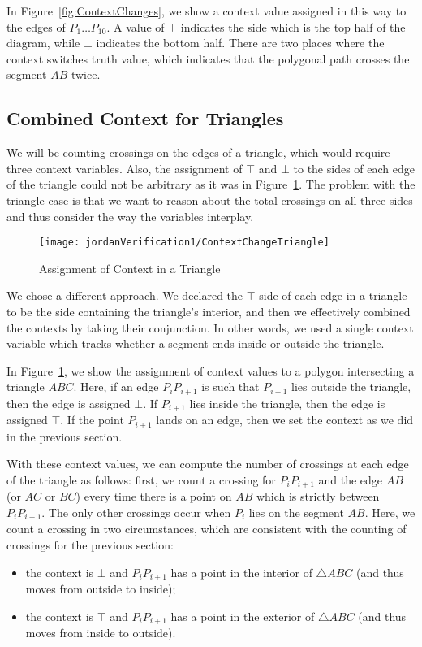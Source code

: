 In Figure~\ref{fig:ContextChanges}, we show a context value assigned in this way to the edges of $P_1\ldots P_{10}$. A value of $\top$ indicates the side which is the top half of the diagram, while $\bot$ indicates the bottom half. There are two places where the context switches truth value, which indicates that the polygonal path crosses the segment $AB$ twice.

\subsection{Combined Context for Triangles}
We will be counting crossings on the edges of a triangle, which would require three context variables. Also, the assignment of $\top$ and $\bot$ to the sides of each edge of the triangle could not be arbitrary as it was in Figure~\ref{fig:ContextChangesTriangle}. The problem with the triangle case is that we want to reason about the total crossings on all three sides and thus consider the way the variables interplay.

\begin{figure}
\centering\texttt{[image: jordanVerification1/ContextChangeTriangle]}
\caption{Assignment of Context in a Triangle}
\label{fig:ContextChangesTriangle}
\end{figure}

We chose a different approach. We declared the $\top$ side of each edge in a triangle to be the side containing the triangle's interior, and then we effectively combined the contexts by taking their conjunction. In other words, we used a single context variable which tracks whether a segment ends inside or outside the triangle. 

In Figure~\ref{fig:ContextChangesTriangle}, we show the assignment of context values to a polygon intersecting a triangle $ABC$. Here, if an edge $P_iP_{i+1}$ is such that $P_{i+1}$ lies outside the triangle, then the edge is assigned $\bot$. If $P_{i+1}$ lies inside the triangle, then the edge is assigned $\top$. If the point $P_{i+1}$ lands on an edge, then we set the context as we did in the previous section.

With these context values, we can compute the number of crossings at each edge of the triangle as follows: first, we count a crossing for $P_iP_{i+1}$ and the edge $AB$ (or $AC$ or $BC$) every time there is a point on $AB$ which is strictly between $P_iP_{i+1}$. The only other crossings occur when $P_i$ lies on the segment $AB$. Here, we count a crossing in two circumstances, which are consistent with the counting of crossings for the previous section:
\begin{itemize}
\item the context is $\bot$ and $P_iP_{i+1}$ has a point in the interior of $\triangle ABC$ (and thus moves from outside to inside);
\item the context is $\top$ and $P_iP_{i+1}$ has a point in the exterior of $\triangle ABC$ (and thus moves from inside to outside).
\end{itemize}

